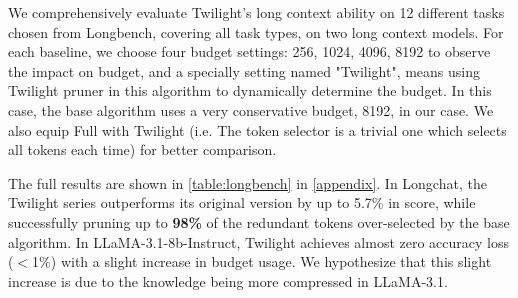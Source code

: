 We comprehensively evaluate Twilight's long context ability on 12 different tasks chosen from Longbench, covering all task types, on two long context models. For each baseline, we choose four budget settings: 256, 1024, 4096, 8192 to observe the impact on budget, and a specially setting named "Twilight", means using Twilight pruner in this algorithm to dynamically determine the budget. In this case, the base algorithm uses a very conservative budget, 8192, in our case. We also equip Full with Twilight (i.e. The token selector is a trivial one which selects all tokens each time) for better comparison.

The full results are shown in \autoref{table:longbench} in \autoref{appendix}. In Longchat, the Twilight series outperforms its original version by up to 5.7\% in score, while successfully pruning up to \textbf{98\%} of the redundant tokens over-selected by the base algorithm. In LLaMA-3.1-8b-Instruct, Twilight achieves almost zero accuracy loss ($<$1\%) with a slight increase in budget usage. We hypothesize that this slight increase is due to the knowledge being more compressed in LLaMA-3.1.


